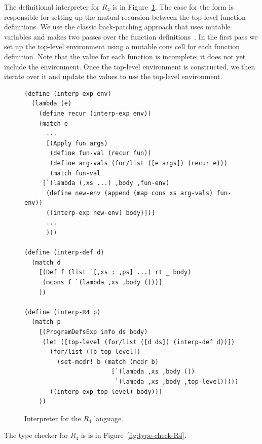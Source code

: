 \documentclass[11pt]{book}
\newcommand{\margincomment}[1]{\marginpar{\color{comment-red}\tiny #1}}
\newcommand{\margincomment}[1]{}
\begin{document}
The definitional interpreter for $R_4$ is in
Figure~\ref{fig:interp-R4}. The case for the  form is
responsible for setting up the mutual recursion between the top-level
function definitions. We use the classic back-patching 
approach that uses mutable variables and makes two passes over the function
definitions~\citep{Kelsey:1998di}.  In the first pass we set up the
top-level environment using a mutable cons cell for each function
definition. Note that the  value for each function is
incomplete; it does not yet include the environment.  Once the
top-level environment is constructed, we then iterate over it and
update the  values to use the top-level environment.

\begin{figure}[tp]
\begin{lstlisting}
(define (interp-exp env)
  (lambda (e)
    (define recur (interp-exp env))
    (match e
      ...
      [(Apply fun args)
       (define fun-val (recur fun))
       (define arg-vals (for/list ([e args]) (recur e)))
       (match fun-val
	 [`(lambda (,xs ...) ,body ,fun-env)
	  (define new-env (append (map cons xs arg-vals) fun-env))
	  ((interp-exp new-env) body)])]
      ...
      )))

(define (interp-def d)
  (match d
    [(Def f (list `[,xs : ,ps] ...) rt _ body)
     (mcons f `(lambda ,xs ,body ()))]
    ))

(define (interp-R4 p)
  (match p
    [(ProgramDefsExp info ds body)
     (let ([top-level (for/list ([d ds]) (interp-def d))])
       (for/list ([b top-level])
         (set-mcdr! b (match (mcdr b)
                        [`(lambda ,xs ,body ())
                         `(lambda ,xs ,body ,top-level)])))
       ((interp-exp top-level) body))]
    ))
\end{lstlisting}
\caption{Interpreter for the $R_4$ language.}
\label{fig:interp-R4}
\end{figure}


\margincomment{TODO: explain type checker}

The type checker for $R_4$ is is in Figure~\ref{fig:type-check-R4}.
\end{document}
